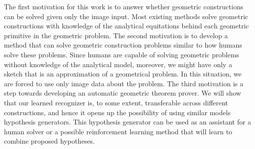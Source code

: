 
The first motivation for this work is to answer whether geometric constructions can be solved given only the image input. Most existing methods solve geometric constructions with knowledge of the analytical equitations behind each geometric primitive in the geometric problem.
\newline \newline
The second motivation is to develop a method that can solve geometric construction problems similar to how humans solve these problems. Since humans are capable of solving geometric problems without knowledge of the analytical model, moreover, we might have only a sketch that is an approximation of a geometrical problem. In this situation, we are forced to use only image data about the problem.
\newline \newline
The third motivation is a step towards developing an automatic geometric theorem prover. We will show that our learned recognizer is, to some extent, transferable across different constructions, and hence it opens up the possibility of using similar models hypothesis generators. This hypothesis generator can be used as an assistant for a human solver or a possible reinforcement learning method that will learn to combine proposed hypotheses.

